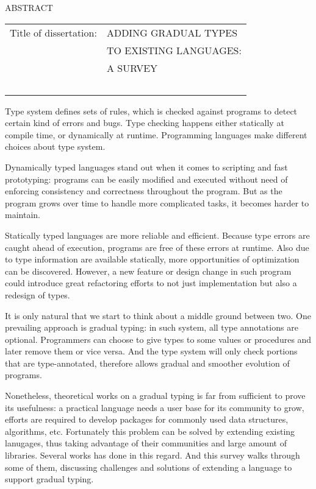\renewcommand{\baselinestretch}{1}
\small \normalsize

\begin{center}
\large{{ABSTRACT}}

\vspace{3em}

\end{center}
\hspace{-.15in}


\vspace{3em}
\begin{tabular}{ll}
	Title of dissertation:    & {\large  ADDING GRADUAL TYPES }\\
	&                     {\large  TO EXISTING LANGUAGES:} \\
	&                     {\large  A SURVEY} \\
	\ \\
\end{tabular}

\renewcommand{\baselinestretch}{2}
\large \normalsize



Type system defines sets of rules, which is checked against programs to
detect certain kind of errors and bugs. Type checking happens either
statically at compile time, or dynamically at runtime. Programming languages
make different choices about type system.

Dynamically typed languages stand out when it comes to scripting and fast prototyping:
programs can be easily modified and executed without need of enforcing consistency and correctness throughout the program.
But as the program grows over time to handle more complicated tasks,
it becomes harder to maintain.

Statically typed languages are more reliable and efficient.
Because type errors are caught ahead of execution,
programs are free of these errors at runtime.
Also due to type information are available statically,
more opportunities of optimization can be discovered.
However, a new feature or design change in such program could introduce
great refactoring efforts to not just implementation but also a redesign
of types.

It is only natural that we start to think about a middle ground
between two.
One prevailing approach is gradual typing: in such system,
all type annotations are optional. Programmers can choose to
give types to some values or procedures and later remove them or vice versa.
And the type system will only check portions that are type-annotated,
therefore allows gradual and smoother evolution of programs.

Nonetheless, theoretical works on a gradual typing is far from sufficient
to prove its usefulness: a practical language needs a user base for its community to grow,
efforts are required to develop packages for commonly used data structures, algorithms, etc. Fortunately this problem can be solved by extending existing lanugages,
thus taking advantage of their communities and large amount of libraries.
Several works has done in this regard. And this survey walks through some of them,
discussing challenges and solutions of extending a language to support gradual typing.